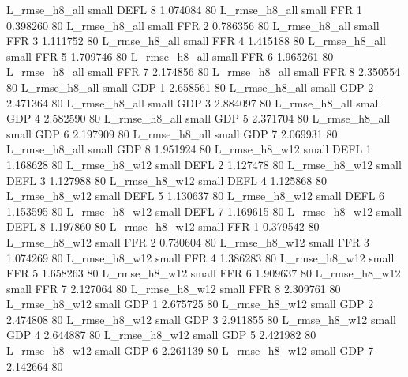  L_rmse_h8_all      small     DEFL                 8 1.074084 80
 L_rmse_h8_all      small      FFR                 1 0.398260 80
 L_rmse_h8_all      small      FFR                 2 0.786356 80
 L_rmse_h8_all      small      FFR                 3 1.111752 80
 L_rmse_h8_all      small      FFR                 4 1.415188 80
 L_rmse_h8_all      small      FFR                 5 1.709746 80
 L_rmse_h8_all      small      FFR                 6 1.965261 80
 L_rmse_h8_all      small      FFR                 7 2.174856 80
 L_rmse_h8_all      small      FFR                 8 2.350554 80
 L_rmse_h8_all      small      GDP                 1 2.658561 80
 L_rmse_h8_all      small      GDP                 2 2.471364 80
 L_rmse_h8_all      small      GDP                 3 2.884097 80
 L_rmse_h8_all      small      GDP                 4 2.582590 80
 L_rmse_h8_all      small      GDP                 5 2.371704 80
 L_rmse_h8_all      small      GDP                 6 2.197909 80
 L_rmse_h8_all      small      GDP                 7 2.069931 80
 L_rmse_h8_all      small      GDP                 8 1.951924 80
 L_rmse_h8_w12      small     DEFL                 1 1.168628 80
 L_rmse_h8_w12      small     DEFL                 2 1.127478 80
 L_rmse_h8_w12      small     DEFL                 3 1.127988 80
 L_rmse_h8_w12      small     DEFL                 4 1.125868 80
 L_rmse_h8_w12      small     DEFL                 5 1.130637 80
 L_rmse_h8_w12      small     DEFL                 6 1.153595 80
 L_rmse_h8_w12      small     DEFL                 7 1.169615 80
 L_rmse_h8_w12      small     DEFL                 8 1.197860 80
 L_rmse_h8_w12      small      FFR                 1 0.379542 80
 L_rmse_h8_w12      small      FFR                 2 0.730604 80
 L_rmse_h8_w12      small      FFR                 3 1.074269 80
 L_rmse_h8_w12      small      FFR                 4 1.386283 80
 L_rmse_h8_w12      small      FFR                 5 1.658263 80
 L_rmse_h8_w12      small      FFR                 6 1.909637 80
 L_rmse_h8_w12      small      FFR                 7 2.127064 80
 L_rmse_h8_w12      small      FFR                 8 2.309761 80
 L_rmse_h8_w12      small      GDP                 1 2.675725 80
 L_rmse_h8_w12      small      GDP                 2 2.474808 80
 L_rmse_h8_w12      small      GDP                 3 2.911855 80
 L_rmse_h8_w12      small      GDP                 4 2.644887 80
 L_rmse_h8_w12      small      GDP                 5 2.421982 80
 L_rmse_h8_w12      small      GDP                 6 2.261139 80
 L_rmse_h8_w12      small      GDP                 7 2.142664 80
